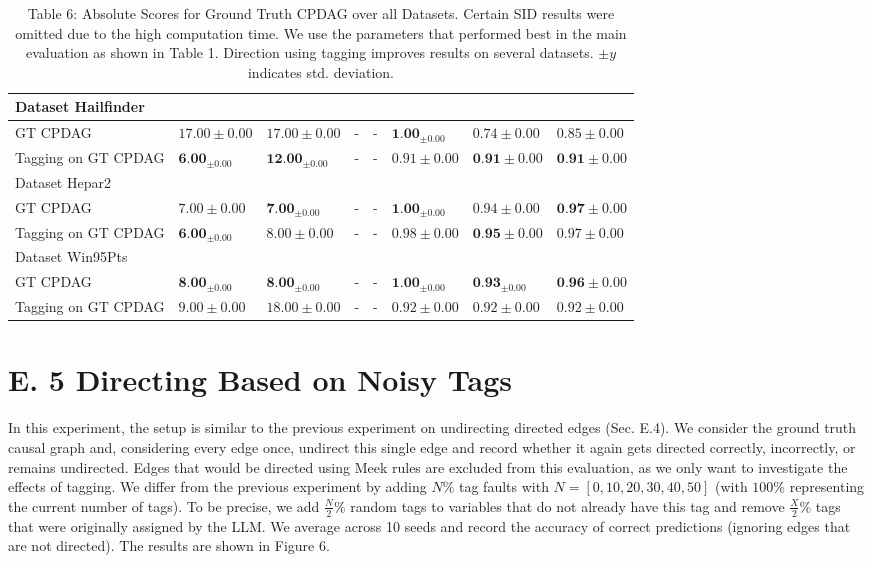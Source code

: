 \documentclass[10pt]{article}
\begin{document}
\begin{table}[h]
\begin{center}
\begin{tabular}{|l|l|l|l|l|l|l|l|}
\hline
Dataset Hailfinder & \multicolumn{7}{|c|}{} \\
\hline
GT CPDAG & $17.00 \pm 0.00$ & $17.00 \pm 0.00$ & - & - & $\mathbf{1 . 0 0}_{ \pm 0.00}$ & $0.74 \pm 0.00$ & $0.85 \pm 0.00$ \\
\hline
Tagging on GT CPDAG & $\mathbf{6 . 0 0}_{ \pm 0.00}$ & $\mathbf{1 2 . 0 0}_{ \pm 0.00}$ & - & - & $0.91 \pm 0.00$ & $\mathbf{0 . 9 1} \pm 0.00$ & $\mathbf{0 . 9 1} \pm 0.00$ \\
\hline
Dataset Hepar2 & \multicolumn{7}{|c|}{} \\
\hline
GT CPDAG & $7.00 \pm 0.00$ & $\mathbf{7 . 0 0}_{ \pm 0.00}$ & - & - & $\mathbf{1 . 0 0}_{ \pm 0.00}$ & $0.94 \pm 0.00$ & $\mathbf{0 . 9 7} \pm 0.00$ \\
\hline
Tagging on GT CPDAG & $\mathbf{6 . 0 0}_{ \pm 0.00}$ & $8.00 \pm 0.00$ & - & - & $0.98 \pm 0.00$ & $\mathbf{0 . 9 5} \pm 0.00$ & $0.97 \pm 0.00$ \\
\hline
Dataset Win95Pts & \multicolumn{7}{|c|}{} \\
\hline
GT CPDAG & $\mathbf{8 . 0 0}_{ \pm 0.00}$ & $\mathbf{8 . 0 0}_{ \pm 0.00}$ & - & - & $\mathbf{1 . 0 0}_{ \pm 0.00}$ & $\mathbf{0 . 9 3}_{ \pm 0.00}$ & $\mathbf{0 . 9 6} \pm 0.00$ \\
\hline
Tagging on GT CPDAG & $9.00 \pm 0.00$ & $18.00 \pm 0.00$ & - & - & $0.92 \pm 0.00$ & $0.92 \pm 0.00$ & $0.92 \pm 0.00$ \\
\hline
\end{tabular}
\captionsetup{labelformat=empty}
\caption{Table 6: Absolute Scores for Ground Truth CPDAG over all Datasets. Certain SID results were omitted due to the high computation time. We use the parameters that performed best in the main evaluation as shown in Table 1. Direction using tagging improves results on several datasets. $\pm y$ indicates std. deviation.}
\end{center}
\end{table}

\section*{E. 5 Directing Based on Noisy Tags}
In this experiment, the setup is similar to the previous experiment on undirecting directed edges (Sec. E.4). We consider the ground truth causal graph and, considering every edge once, undirect this single edge and record whether it again gets directed correctly, incorrectly, or remains undirected. Edges that would be directed using Meek rules are excluded from this evaluation, as we only want to investigate the effects of tagging. We differ from the previous experiment by adding $N \%$ tag faults with $N=[0,10,20,30,40,50]$ (with $100 \%$ representing the current number of tags). To be precise, we add $\frac{N}{2} \%$ random tags to variables that do not already have this tag and remove $\frac{X}{2} \%$ tags that were originally assigned by the LLM. We average across 10 seeds and record the accuracy of correct predictions (ignoring edges that are not directed). The results are shown in Figure 6.
\end{document}
